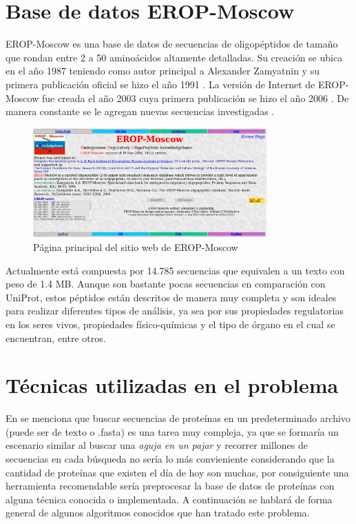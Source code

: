 \section{Base de datos EROP-Moscow}

EROP-Moscow es una base de datos de secuencias de oligopéptidos de tamaño que rondan entre 2 a 50 aminoácidos altamente detalladas. Su creación se ubica en el año 1987 teniendo como autor principal a Alexander Zamyatnin y su primera publicación oficial se hizo el año 1991 \cite{erop2}. La versión de Internet de EROP-Moscow fue creada el año 2003 cuya primera publicación se hizo el año 2006 \cite{erop3}. De manera constante se le agregan nuevas secuencias investigadas \cite{eropmoscow}.

\begin{figure}[h]
    \centering
    \includegraphics[width=0.8\textwidth]{./images/eropmoscow_main.png}
    \caption{Página principal del sitio web de EROP-Moscow}
    \label{fig:image8}
\end{figure}

Actualmente está compuesta por 14.785 secuencias que equivalen a un texto con peso de 1.4 MB. Aunque son bastante pocas secuencias en comparación con UniProt, estos péptidos están descritos de manera muy completa y son ideales para realizar diferentes tipos de análisis, ya sea por sus propiedades regulatorias en los seres vivos, propiedades físico-químicas y el tipo de órgano en el cual se encuentran, entre otros.

\section{Técnicas utilizadas en el problema}

En \cite{searching} se menciona que buscar secuencias de proteínas en un predeterminado archivo (puede ser de texto o .fasta) es una tarea muy compleja, ya que se formaría un escenario similar al buscar una {\textit{aguja en un pajar}} y recorrer millones de secuencias en cada búsqueda no sería lo más convieniente considerando que la cantidad de proteínas que existen el día de hoy son muchas, por consiguiente una herramienta recomendable sería preprocesar la base de datos de proteínas con alguna técnica conocida o implementada. A continuación se hablará de forma general de algunos algoritmos conocidos que han tratado este problema.

